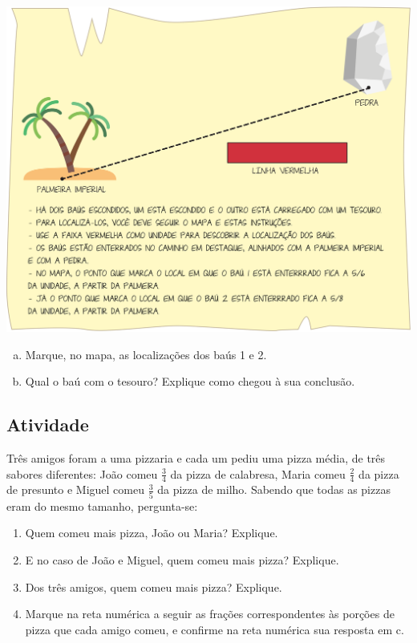\noindent\includegraphics[width=\textwidth, keepaspectratio]{../figuras/licao03/ativ7_fig01.png}

\begin{enumerate}[a)]
 \item Marque, no mapa, as localizações dos baús 1 e 2.
 \item Qual o baú com o tesouro? Explique como chegou à sua conclusão.
\end{enumerate}

\subsection{Atividade}

Três amigos foram a uma pizzaria e cada um pediu uma pizza média, de três sabores diferentes: João comeu $\frac{3}{4}$ da pizza de calabresa, Maria comeu  $\frac{2}{4}$ da pizza de presunto e Miguel comeu $\frac{3}{5}$ da pizza de milho. Sabendo que todas as pizzas eram do mesmo tamanho, pergunta-se:
\begin{enumerate} [\quad a)] %
  \item     Quem comeu mais pizza, João ou Maria? Explique.
  \item     E no caso de João e Miguel, quem comeu mais pizza? Explique.
  \item     Dos três amigos, quem comeu mais pizza? Explique.
  \item     Marque na reta numérica a seguir as frações correspondentes às porções de pizza que cada amigo comeu, e confirme na reta numérica sua resposta em c.
\end{enumerate} %


